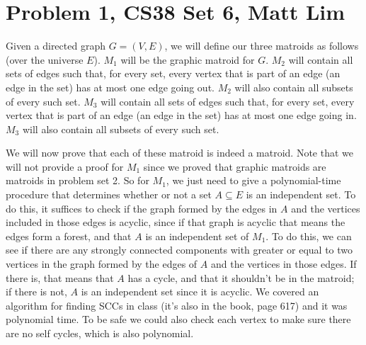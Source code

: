 \documentclass{article}
\begin{document}
\section*{Problem 1, CS38 Set 6, Matt Lim}
Given a directed graph $G = (V,E)$, we will define our three matroids as follows
(over the universe $E$). $M_1$
will be the graphic matroid for $G$.
$M_2$ will contain all sets of edges such
that, for every set, every vertex that is part of an edge (an edge in the set)
has at most one edge going out. $M_2$ will also contain all subsets of every such set. $M_3$
will contain all sets of edges such that, for every set, every vertex that is part of an edge
(an edge in the set) has at most one edge going in. $M_3$ will also contain all
subsets of every such set.

We will now prove that each of these matroid is indeed a matroid. Note that we
will not provide a proof for $M_1$ since we proved that graphic matroids are
matroids in problem set 2. So for $M_1$, we just need to give a polynomial-time
procedure that determines whether or not a set $A \subseteq E$ is an independent
set. To do this, it suffices to check if the graph formed by the edges
in $A$ and the vertices included in those edges is acyclic, since if that graph
is acyclic that means the
edges form a forest, and that $A$ is an independent set of $M_1$.
To do this, we can see if there are any strongly connected components with
greater or equal to two vertices in the
graph formed by the edges of $A$ and the vertices in those edges. If there is,
that means that $A$ has a cycle, and that it shouldn't be in the matroid; if
there is not, $A$ is an independent set since it is acyclic. We covered an algorithm for finding
SCCs in class (it's also in the book, page 617)
and it was polynomial time. To be safe we could also check each
vertex to make sure there are no self cycles, which is also polynomial.
\end{document}
